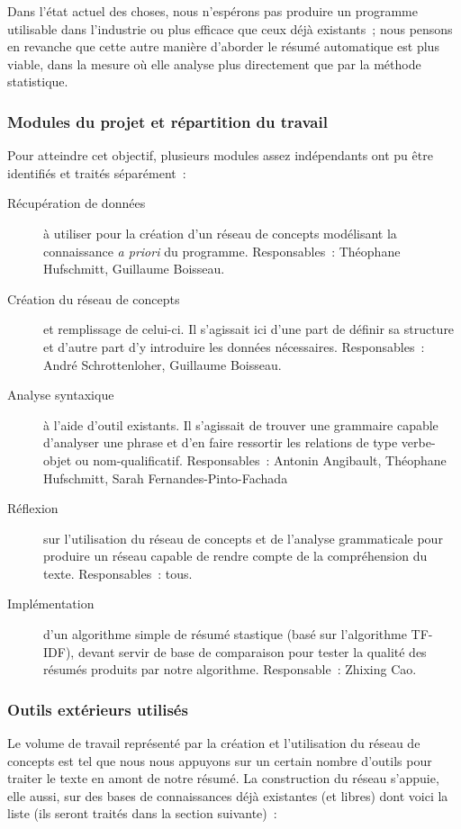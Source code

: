 \documentclass[a4paper, 12pt]{article}
\begin{document}
Dans l'état actuel des choses, nous n'espérons pas produire un programme utilisable dans l'industrie ou plus efficace que ceux déjà existants~; nous pensons en revanche que cette autre manière d'aborder le résumé automatique est plus viable, dans la mesure où elle analyse plus directement que par la méthode statistique.

\subsubsection{Modules du projet et répartition du travail}
Pour atteindre cet objectif, plusieurs modules assez indépendants ont pu être identifiés et traités séparément~:

\begin{description}
	\item[Récupération de données] à utiliser pour la création d'un réseau de concepts modélisant la connaissance \textit{a priori} du programme. Responsables~: Théophane Hufschmitt, Guillaume Boisseau.
	\item[Création du réseau de concepts] et remplissage de celui-ci. Il s'agissait ici d'une part de définir sa structure et d'autre part d'y introduire les données nécessaires. Responsables~: André Schrottenloher, Guillaume Boisseau.
	\item[Analyse syntaxique] à l'aide d'outil existants. Il s'agissait de trouver une grammaire capable d'analyser une phrase et d'en faire ressortir les relations de type verbe-objet ou nom-qualificatif. Responsables~: Antonin Angibault, Théophane Hufschmitt, Sarah Fernandes-Pinto-Fachada
	\item[Réflexion] sur l'utilisation du réseau de concepts et de l'analyse grammaticale pour produire un réseau capable de rendre compte de la compréhension du texte. Responsables~: tous.
	\item[Implémentation] d'un algorithme simple de résumé stastique (basé sur l'algorithme TF-IDF), devant servir de base de comparaison pour tester la qualité des résumés produits par notre algorithme.  Responsable~: Zhixing Cao. 
\end{description}

\subsubsection{Outils extérieurs utilisés}

Le volume de travail représenté par la création et l'utilisation du réseau de concepts est tel que nous nous appuyons sur un certain nombre d'outils pour traiter le texte en amont de notre résumé. La construction du réseau s'appuie, elle aussi, sur des bases de connaissances déjà existantes (et libres) dont voici la liste (ils seront traités dans la section suivante)~:
\end{document}
